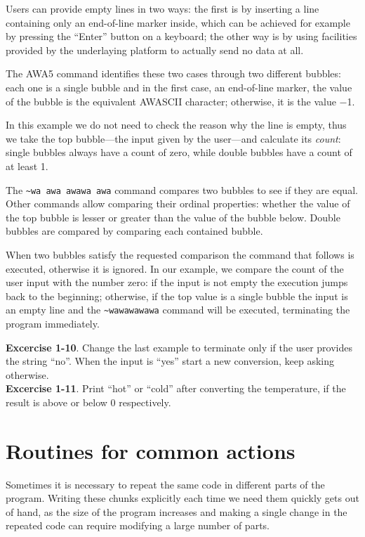 \documentclass[11pt,a4paper,draft]{book}
\begin{document}
Users can provide empty lines in two ways: the first is by inserting a
line containing only an end-of-line marker inside, which can be
achieved for example by pressing the \enquote{Enter} button on a
keyboard; the other way is by using facilities provided by the
underlaying platform to actually send no data at all.

The AWA5 command identifies these two cases through two different
bubbles: each one is a single bubble and in the first case, an
end-of-line marker, the value of the bubble is the equivalent AWASCII
character; otherwise, it is the value \num{-1}.

In this example we do not need to check the reason why the line is
empty, thus we take the top bubble---the input given by the user---and
calculate its \emph{count}: single bubbles always have a count of
zero, while double bubbles have a count of at least 1.

The \verb|~wa awa awawa awa| command compares two bubbles to see if
they are equal. Other commands allow comparing their ordinal
properties: whether the value of the top bubble is lesser or greater
than the value of the bubble below. Double bubbles are compared by
comparing each contained bubble.

When two bubbles satisfy the requested comparison the command that
follows is executed, otherwise it is ignored. In our example, we
compare the count of the user input with the number zero: if the input
is not empty the execution jumps back to the beginning; otherwise, if
the top value is a single bubble the input is an empty line and the
\verb|~wawawawawa| command will be executed, terminating the program
immediately.

\textbf{Excercise 1-10}. Change the last example to terminate only if
the user provides the string \enquote{no}. When the input is
\enquote{yes} start a new conversion, keep asking otherwise. \\
\textbf{Excercise 1-11}. Print \enquote{hot} or \enquote{cold} after
converting the temperature, if the result is above or below \num{0}
respectively.

\section{Routines for common actions}
Sometimes it is necessary to repeat the same code in different parts
of the program.  Writing these chunks explicitly each time we need
them quickly gets out of hand, as the size of the program increases
and making a single change in the repeated code can require modifying
a large number of parts.
\end{document}

